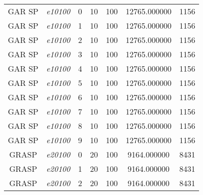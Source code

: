 {\begin{longtable}{cc|c|cc|cc}
			GAR SP             & \textit{e10100}    & 0                               & 10               & 100              & 12765.000000                          & 1156 \\ 
			GAR SP             & \textit{e10100}    & 1                               & 10               & 100              & 12765.000000                          & 1156 \\ 
			GAR SP             & \textit{e10100}    & 2                               & 10               & 100              & 12765.000000                          & 1156 \\ 
			GAR SP             & \textit{e10100}    & 3                               & 10               & 100              & 12765.000000                          & 1156 \\ 
			GAR SP             & \textit{e10100}    & 4                               & 10               & 100              & 12765.000000                          & 1156 \\ 
			GAR SP             & \textit{e10100}    & 5                               & 10               & 100              & 12765.000000                          & 1156 \\ 
			GAR SP             & \textit{e10100}    & 6                               & 10               & 100              & 12765.000000                          & 1156 \\ 
			GAR SP             & \textit{e10100}    & 7                               & 10               & 100              & 12765.000000                          & 1156 \\ 
			GAR SP             & \textit{e10100}    & 8                               & 10               & 100              & 12765.000000                          & 1156 \\ 
			GAR SP             & \textit{e10100}    & 9                               & 10               & 100              & 12765.000000                          & 1156 \\ \hline
			GRASP              & \textit{e20100}    & 0                               & 20               & 100              & 9164.000000                          & 8431 \\ 
			GRASP              & \textit{e20100}    & 1                               & 20               & 100              & 9164.000000                          & 8431 \\ 
			GRASP              & \textit{e20100}    & 2                               & 20               & 100              & 9164.000000                          & 8431 \\ 

\end{longtable}}
